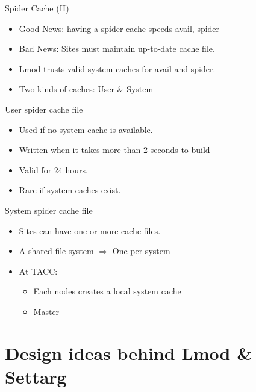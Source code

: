 \documentclass{beamer}
\begin{document}
\begin{frame}{Spider Cache (II)}
  \begin{itemize}
     \item Good News: having a spider cache speeds avail, spider
     \item Bad News: Sites must maintain up-to-date cache file.
     \item Lmod trusts valid system caches for avail and spider.
     \item Two kinds of caches: User \& System
  \end{itemize}
\end{frame}

\begin{frame}{User spider cache file}
  \begin{itemize}
     \item Used if no system cache is available.
     \item Written when it takes more than 2 seconds to build
     \item Valid for 24 hours.
     \item Rare if system caches exist.
  \end{itemize}
\end{frame}

\begin{frame}{System spider cache file}
  \begin{itemize}
     \item Sites can have one or more cache files.
     \item A shared file system $\Rightarrow$ One
       per system
     \item At TACC:
       \begin{itemize}
          \item Each nodes creates a local system cache
          \item Master
       \end{itemize}
  \end{itemize}
\end{frame}


\section{Design ideas behind Lmod \& Settarg}
\end{document}
